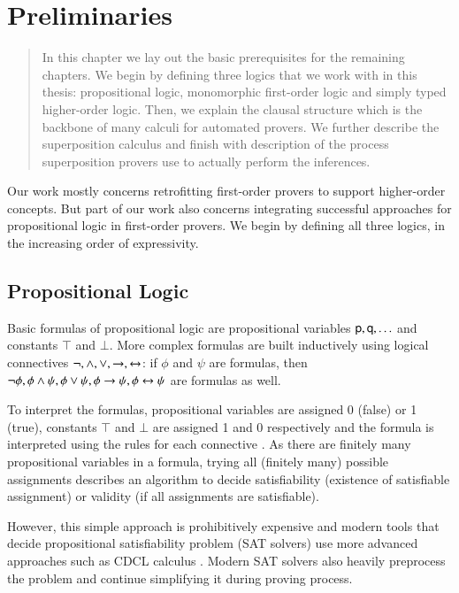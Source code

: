 \chapter{Preliminaries}
\label{ch:pre}

\begin{abstract}
    In this chapter we lay out the basic prerequisites for the remaining
    chapters. We begin by defining three logics that we work with in this
    thesis: propositional logic, monomorphic first-order logic and simply typed
    higher-order logic. Then, we explain the clausal structure which is the
    backbone of many calculi for automated provers. We further describe the
    superposition calculus and finish with description of the process superposition
    provers use to actually perform the inferences.
\end{abstract}
      
\newpage

Our work mostly concerns retrofitting first-order provers to support
higher-order concepts. But part of our work also concerns integrating
successful approaches for propositional logic in first-order
provers. We begin by defining all three logics, in the increasing
order of expressivity.

\section{Propositional Logic}

Basic formulas of propositional logic are propositional variables
$\mathsf{p}, \mathsf{q}, \ldots$ and constants $\top$ and $\bot$. More complex
formulas are built inductively using logical connectives $\neg, \land, \lor,
\rightarrow, \leftrightarrow$: if $\phi$ and $\psi$ are formulas, then $\neg \phi, \phi \land
\psi, \phi \lor \psi, \phi \rightarrow \psi, \phi \leftrightarrow \psi$ are formulas as well.

To interpret the formulas, propositional variables are assigned 0 (false) or 1
(true), constants $\top$ and $\bot$ are assigned 1 and 0 respectively and the
formula is interpreted using the rules for each connective
\cite[Sect.~1.4]{hr-00-logic-in-cs}. As there are finitely many propositional
variables in a formula, trying all (finitely many) possible assignments
describes an algorithm to decide satisfiability (existence of satisfiable
assignment) or validity (if all assignments are satisfiable).

However, this simple approach is prohibitively expensive and modern tools that
decide propositional satisfiability problem (SAT solvers) use more advanced
approaches such as CDCL calculus \cite{mss-96-cdcl}. Modern SAT solvers also
heavily preprocess the problem and continue simplifying it during proving
process.

